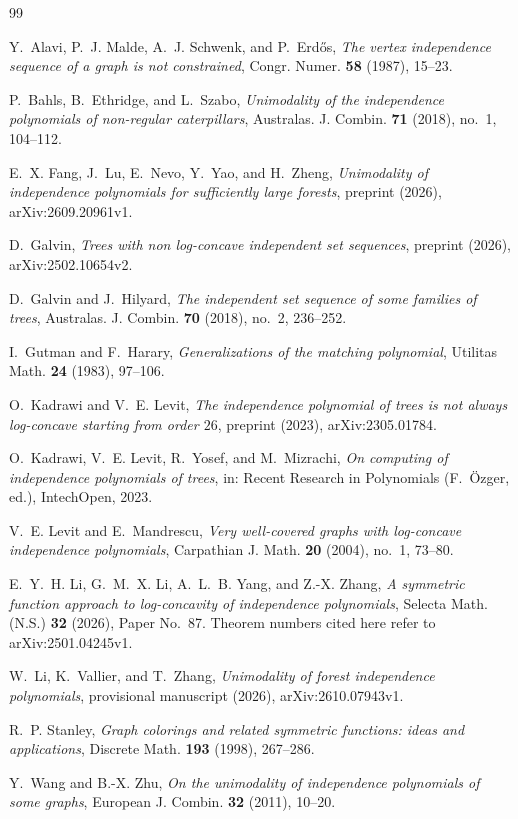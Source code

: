 \documentclass{amsart}
\theoremstyle{definition}
\theoremstyle{remark}
\numberwithin{equation}{section}
\begin{document}
\begin{thebibliography}{99}

Y.~Alavi, P.~J. Malde, A.~J. Schwenk, and P.~Erd\H{o}s, \emph{The vertex independence sequence of a graph is not constrained}, Congr. Numer. \textbf{58} (1987), 15--23.

P.~Bahls, B.~Ethridge, and L.~Szabo, \emph{Unimodality of the independence polynomials of non-regular caterpillars}, Australas. J. Combin. \textbf{71} (2018), no.~1, 104--112.

E.~X. Fang, J.~Lu, E.~Nevo, Y.~Yao, and H.~Zheng, \emph{Unimodality of independence polynomials for sufficiently large forests}, preprint (2026), arXiv:2609.20961v1.

D.~Galvin, \emph{Trees with non log-concave independent set sequences}, preprint (2026), arXiv:2502.10654v2.

D.~Galvin and J.~Hilyard, \emph{The independent set sequence of some families of trees}, Australas. J. Combin. \textbf{70} (2018), no.~2, 236--252.

I.~Gutman and F.~Harary, \emph{Generalizations of the matching polynomial}, Utilitas Math. \textbf{24} (1983), 97--106.

O.~Kadrawi and V.~E. Levit, \emph{The independence polynomial of trees is not always log-concave starting from order $26$}, preprint (2023), arXiv:2305.01784.

O.~Kadrawi, V.~E. Levit, R.~Yosef, and M.~Mizrachi, \emph{On computing of independence polynomials of trees}, in: Recent Research in Polynomials (F.~\"Ozger, ed.), IntechOpen, 2023.

V.~E. Levit and E.~Mandrescu, \emph{Very well-covered graphs with log-concave independence polynomials}, Carpathian J. Math. \textbf{20} (2004), no.~1, 73--80.

E.~Y.~H. Li, G.~M.~X. Li, A.~L.~B. Yang, and Z.-X. Zhang, \emph{A symmetric function approach to log-concavity of independence polynomials}, Selecta Math. (N.S.) \textbf{32} (2026), Paper No.~87. Theorem numbers cited here refer to arXiv:2501.04245v1.

W.~Li, K.~Vallier, and T.~Zhang, \emph{Unimodality of forest independence polynomials}, provisional manuscript (2026), arXiv:2610.07943v1.

R.~P. Stanley, \emph{Graph colorings and related symmetric functions: ideas and applications}, Discrete Math. \textbf{193} (1998), 267--286.

Y.~Wang and B.-X. Zhu, \emph{On the unimodality of independence polynomials of some graphs}, European J. Combin. \textbf{32} (2011), 10--20.

\end{thebibliography}
\end{document}
